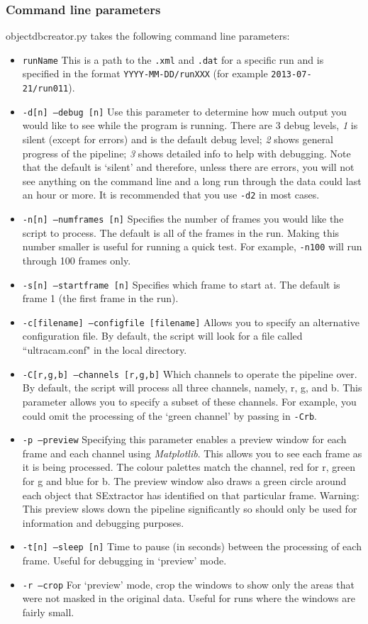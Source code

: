 \subsubsection{Command line parameters}
objectdbcreator.py takes the following command line parameters:
\begin{itemize}
  \item \texttt{runName} This is a path to the \texttt{.xml} and \texttt{.dat} for a specific run and is specified in the format \texttt{YYYY-MM-DD/runXXX}  (for example \texttt{2013-07-21/run011}).
  \item \texttt{-d[n] --debug [n]} Use this parameter to determine how much output you would like to see while the program is running. There are 3 debug levels, \emph{1} is silent (except for errors) and is the default debug level; \emph{2} shows general progress of the pipeline; \emph{3} shows detailed info to help with debugging. Note that the default is `silent' and therefore, unless there are errors, you will not see anything on the command line and a long run through the data could last an hour or more. It is recommended that you use \texttt{-d2} in most cases. 
  \item \texttt{-n[n] --numframes [n]} Specifies the number of frames you would like the script to process. The default is all of the frames in the run. Making this number smaller is useful for running a quick test. For example, \texttt{-n100} will run through 100 frames only.
   \item \texttt{-s[n] --startframe [n]} Specifies which frame to start at. The default is frame 1 (the first frame in the run). 
  \item \texttt{-c[filename] --configfile [filename]} Allows you to specify an alternative configuration file. By default, the script will look for a file called ``ultracam.conf" in the local directory. 
  \item \texttt{-C[r,g,b] --channels [r,g,b]} Which channels to operate the pipeline over. By default, the script will process all three channels, namely, r, g, and b. This parameter allows you to specify a subset of these channels. For example, you could omit the processing of the `green channel' by passing in \texttt{-Crb}. 
  \item \texttt{-p --preview} Specifying this parameter enables a preview window for each frame and each channel using \emph{Matplotlib}. This allows you to see each frame as it is being processed. The colour palettes match the channel, red for r, green for g and blue for b. The preview window also draws a green circle around each object that SExtractor has identified on that particular frame. Warning: This preview slows down the pipeline significantly so should only be used for information and debugging purposes. 
  \item \texttt{-t[n] --sleep [n]} Time to pause (in seconds) between the processing of each frame. Useful for debugging in `preview' mode. 
  \item \texttt{-r --crop} For `preview' mode, crop the windows to show only the areas that were not masked in the original data. Useful for runs where the windows are fairly small. 
\end{itemize}

